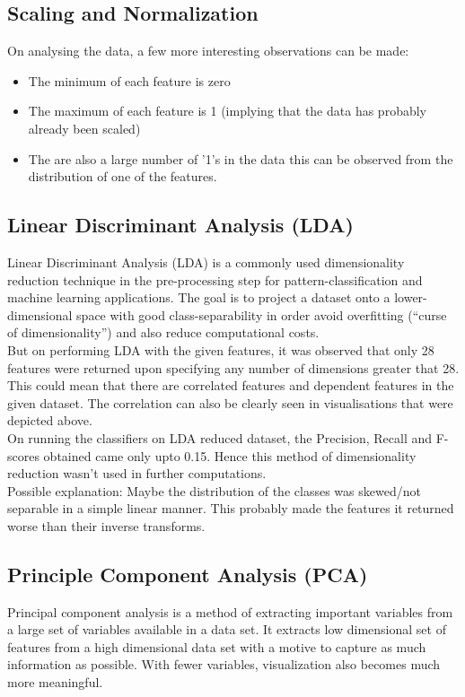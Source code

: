\documentclass[12pt]{report}
\begin{document}
\subsection{Scaling and Normalization}

On analysing the data, a few more interesting observations can be made:
\begin{itemize}
    \item The minimum of each feature is zero
    \item The maximum of each feature is 1 (implying that the data has probably already been scaled)
    \item The are also a large number of '1's in the data this can be observed from the distribution of one of the features.\\
    
\end{itemize}


\subsection{Linear Discriminant Analysis (LDA)}
Linear Discriminant Analysis (LDA) is a commonly used dimensionality reduction technique in the pre-processing step for pattern-classification and machine learning applications. The goal is to project a dataset onto a lower-dimensional space with good class-separability in order avoid overfitting (“curse of dimensionality”) and also reduce computational costs.\\

But on performing LDA with the given features, it was observed that only 28 features were returned upon specifying any number of dimensions greater that 28. This could mean that there are correlated features and dependent features in the given dataset. The correlation can also be clearly seen in visualisations that were depicted above.\\

On running the classifiers on LDA reduced dataset, the Precision, Recall and F-scores obtained came only upto 0.15. Hence this method of dimensionality reduction wasn't used in further computations.\\
Possible explanation: Maybe the distribution of the classes was skewed/not separable in a simple linear manner. This probably made the features it returned worse than their inverse transforms.\\


\subsection{Principle Component Analysis (PCA)}
Principal component analysis is a method of extracting important variables from a large set of variables available in a data set. It extracts low dimensional set of features from a high dimensional data set with a motive to capture as much information as possible. With fewer variables, visualization also becomes much more meaningful.\\
\end{document}
